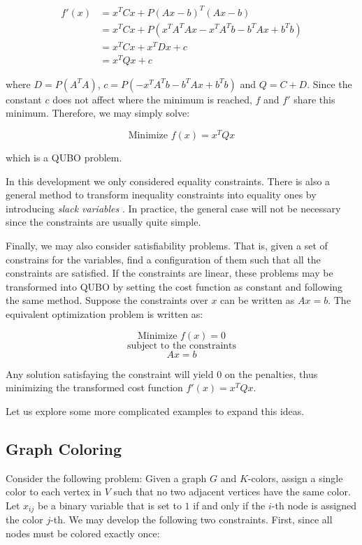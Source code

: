 \begin{equation*}
	\begin{split}
		f'(x)	& = x^T C x + P (Ax - b)^T (Ax - b) \\
		& = x^T C x + P (x^TA^TAx - x^TA^Tb - b^TAx + b^Tb) \\
		& = x^T C x + x^T D x + c \\
		& = x^T Q x + c 
	\end{split}
\end{equation*}

where $D = P(A^TA)$, $c = P(- x^TA^Tb - b^TAx + b^Tb)$ and $Q = C + D$. Since the constant $c$ does not affect where the minimum is reached, $f$ and $f'$ share this minimum. Therefore, we may simply solve:

$$ \text{Minimize } f(x) = x^T Q x $$

which is a QUBO problem.

In this development we only considered equality constraints. There is also a general method to transform inequality constraints into equality ones by introducing \emph{slack variables} \cite{Hull2003}. In practice, the general case will not be necessary since the constraints are usually quite simple.

Finally, we may also consider satisfiability problems. That is, given a set of constrains for the variables, find a configuration of them such that all the constraints are satisfied. If the constraints are linear, these problems may be transformed into QUBO by setting the cost function as constant and following the same method. Suppose the constraints over $x$ can be written as $Ax = b$. The equivalent optimization problem is written as:

$$ \text{Minimize } f(x) = 0 $$
$$ \text{subject to the constraints} $$
$$ Ax = b $$

Any solution satisfaying the constraint will yield $0$ on the penalties, thus minimizing the transformed cost function $f'(x) = x^T Q x$. 

Let us explore some more complicated examples to expand this ideas.


\subsection{Graph Coloring}


Consider the following problem: Given a graph $G$ and $K$-colors, assign a single color to each vertex in $V$ such that no two adjacent vertices have the same color. Let $x_{ij}$ be a binary variable that is set to $1$ if and only if the $i$-th node is assigned the color $j$-th. We may develop the following two constraints. First, since all nodes must be colored exactly once:

